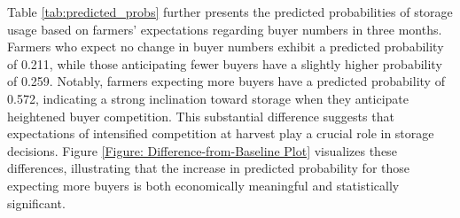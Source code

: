 \documentclass[12pt]{article}
\begin{document}
Table \ref{tab:predicted_probs} further presents the predicted probabilities of storage usage based on farmers’ expectations regarding buyer numbers in three months. Farmers who expect no change in buyer numbers exhibit a predicted probability of 0.211, while those anticipating fewer buyers have a slightly higher probability of 0.259. Notably, farmers expecting more buyers have a predicted probability of 0.572, indicating a strong inclination toward storage when they anticipate heightened buyer competition. This substantial difference suggests that expectations of intensified competition at harvest play a crucial role in storage decisions. Figure \ref{Figure: Difference-from-Baseline Plot} visualizes these differences, illustrating that the increase in predicted probability for those expecting more buyers is both economically meaningful and statistically significant.



\end{document}
